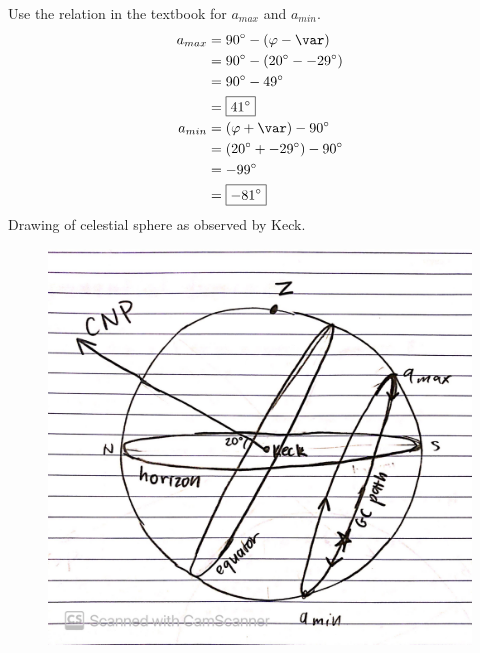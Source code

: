 \documentclass{homework}
\begin{document}
\question
\begin{alphaparts}
    \questionpart Use the relation in the textbook for $a_{max}$ and $a_{min}$.
    \begin{align*}
        a_{max}	&= 	\SI{90}{\degree} - (\varphi - \var) \\
                &=  \SI{90}{\degree} - (\SI{20}{\degree} - \SI{-29}{\degree}) \\
                &=  \SI{90}{\degree} - \SI{49}{\degree} \\
                &=  \boxed{\SI{41}{\degree}}    \\
        a_{min} &=  (\varphi + \var) - \SI{90}{\degree} \\
                &=  (\SI{20}{\degree} + \SI{-29}{\degree}) - \SI{90}{\degree} \\
                &=  \SI{-99}{\degree}   \\
                &=  \boxed{\SI{-81}{\degree}}
    \end{align*}
    \newpage
    \questionpart Drawing of celestial sphere as observed by Keck.
    \begin{figure}[htbp]
        \centering
        \includegraphics[width=0.7\linewidth]{gc_keck.jpg}
    \end{figure}
    

\end{alphaparts}
\end{document}
